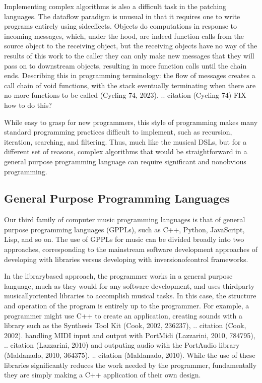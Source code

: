 \documentclass[letterpaper,10pt,english]{sphinxmanual}
\begin{document}
\sphinxAtStartPar
Implementing complex algorithms is also a difficult task in the patching languages.
The dataflow paradigm is unusual in that it requires one to write programs entirely
using side\sphinxhyphen{}effects. Objects do computations in response to incoming messages, which, under
the hood, are indeed function calls from the source object to the receiving object,
but the receiving objects have no way of  the results of this work to the caller \sphinxhyphen{} they
can only make new messages that they will pass on to downstream objects, resulting in more
function calls until the chain ends.
Describing this in programming terminology: the flow of messages creates a call chain
of void functions, with the stack eventually terminating when there are no more functions
to be called (Cycling 74, 2023).
.. citation (Cycling 74)  FIX  how to do this?

\sphinxAtStartPar
While easy to grasp for new programmers,
this style of programming makes many standard programming practices difficult to implement,
such as recursion, iteration, searching, and filtering.
Thus, much like the musical DSLs, but for a different set of reasons, complex
algorithms that would be straightforward in a general purpose programming language can require
significant and non\sphinxhyphen{}obvious programming.


\subsection{General Purpose Programming Languages}
\label{\detokenize{background:general-purpose-programming-languages}}
\sphinxAtStartPar
Our third family of computer music programming languages is that of
general purpose programming languages (GPPLs), such as C++, Python, JavaScript, Lisp, and so on.
The use of GPPLs for music can be divided broadly
into two approaches, corresponding to the mainstream software development
approaches of developing with libraries versus developing with
inversion\sphinxhyphen{}of\sphinxhyphen{}control frameworks.

\sphinxAtStartPar
In the library\sphinxhyphen{}based approach, the programmer works in a general purpose language,
much as they would for any software development, and uses third\sphinxhyphen{}party
musically\sphinxhyphen{}oriented libraries to accomplish musical tasks.
In this case, the structure and operation of the program is entirely up to the programmer.
For example, a programmer might use C++ to create an application, creating sounds
with a library such as the Synthesis Tool Kit (Cook, 2002, 236\sphinxhyphen{}237),
.. citation (Cook, 2002).
handling MIDI input and output with PortMidi (Lazzarini, 2010, 784\sphinxhyphen{}795),
.. citation (Lazzarini, 2010)
and outputing audio with the PortAudio library (Maldanado, 2010, 364\sphinxhyphen{}375).
.. citation (Maldanado, 2010).
While the use of these libraries significantly reduces the work needed by the programmer,
fundamentally they are simply making a C++ application of their own design.
\end{document}
